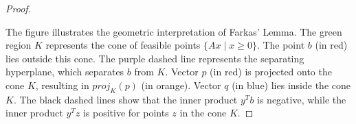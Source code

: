 \begin{proof}
\begin{center}
  \end{center}

  The figure illustrates the geometric interpretation of Farkas' Lemma. The green region $K$ represents the cone of feasible points $\{Ax \mid x \ge 0\}$. The point $b$ (in red) lies outside this cone. The purple dashed line represents the separating hyperplane, which separates $b$ from $K$. Vector $p$ (in red) is projected onto the cone $K$, resulting in $proj_K(p)$ (in orange). Vector $q$ (in blue) lies inside the cone $K$. The black dashed lines show that the inner product $y^Tb$ is negative, while the inner product $y^Tz$ is positive for points $z$ in the cone $K$.

\end{proof}


